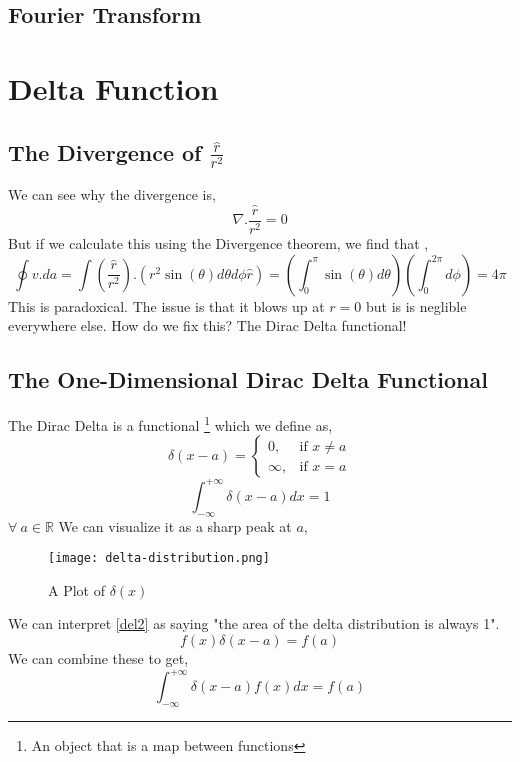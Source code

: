 \subsection{Fourier Transform}

\section{Delta Function}
\subsection{The Divergence of $\frac{\hat{r}}{r^{2}}$}
We can see why the divergence is,
\begin{equation}
\nabla . \frac{\hat{r}}{r^{2}} = 0
\end{equation}
But if we calculate this using the Divergence theorem, we find that ,
\begin{equation}
	\oint v .da = \int \left( \frac{\hat{r}}{r^{2}} \right) . \left( r^{2} \sin(\theta) d \theta d \phi \hat{r} \right) = \left( \int_{0}^{\pi} \sin(\theta) d \theta \right) \left( \int_{0}^{2\pi} d \phi \right) = 4 \pi
\end{equation}
This is paradoxical. The issue is that it blows up at $r=0$ but is is neglible everywhere else. How do we fix this? The Dirac Delta functional!
\subsection{The One-Dimensional Dirac Delta Functional}
The Dirac Delta is a functional \footnote{An object that is a map between functions} which we define as,
\begin{equation} \label{deltadef}
\delta(x-a)= 
\begin{cases}
0, & \text{if } x \neq a\\
\infty,              & \text{if } x = a
\end{cases}
\end{equation}
\begin{equation}
\int_{- \infty}^{+ \infty} \delta(x-a) dx = 1
\label{del2}
\end{equation}
$\forall \  a \in \mathbb{R}$
We can visualize it as a sharp peak at $a$,
\begin{figure}
	\centering
	\texttt{[image: delta-distribution.png]}
	\caption{A Plot of $\delta(x)$}
\end{figure}
We can interpret \ref{del2} as saying "the area of the delta distribution is always 1".
\begin{equation}
f(x)\delta(x - a ) = f(a)
\end{equation}
We can combine these to get,
\begin{equation}
\int_{- \infty}^{+ \infty} \delta(x-a) f(x) dx = f(a)
\end{equation}

